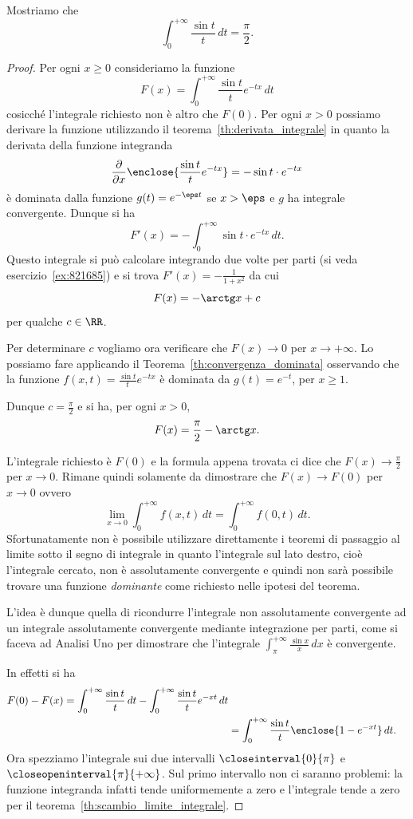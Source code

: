 \begin{exercise}
  \label{ex:integrale_sin_integrale}%
Mostriamo che 
  \[
    \int_0^{+\infty} \frac{\sin t}{t}\, dt = \frac \pi 2.
  \] 
\end{exercise}
\begin{proof}
Per ogni $x \ge 0$ consideriamo la funzione 
\[
  F(x) = \int_0^{+\infty} \frac{\sin t}{t}e^{-tx}\, dt
\]
cosicché l'integrale richiesto non è altro che $F(0)$.
Per ogni $x>0$
possiamo derivare la funzione utilizzando il teorema~\ref{th:derivata_integrale}
in quanto la derivata della funzione integranda 
\[
  \frac{\partial}{\partial x}\enclose{\frac{\sin t}{t}e^{-tx}} 
  = -\sin t \cdot e^{-tx}
\]
è dominata dalla funzione $g(t) = e^{- \eps t}$ se $x>\eps$ e 
$g$ ha integrale convergente.
Dunque si ha 
\[
  F'(x) = - \int_0^{+\infty} \sin t \cdot e^{-tx}\, dt. 
\]
Questo integrale si può calcolare integrando due volte per parti 
(si veda esercizio~\ref{ex:821685}) e si trova 
$F'(x) = -\frac{1}{1+x^2}$ da cui
\[
  F(x) = -\arctg x + c
\]
per qualche $c \in \RR$.

Per determinare $c$ 
vogliamo ora verificare che $F(x) \to 0$ per $x\to +\infty$.
Lo possiamo fare applicando il Teorema~\ref{th:convergenza_dominata} osservando che 
la funzione $f(x,t) = \frac{\sin t}{t}e^{-tx}$ è dominata da $g(t) = e^{-t}$, per $x\ge 1$.

Dunque $c=\frac{\pi} 2$ e si ha, per ogni $x>0$,
\[
  F(x) = \frac{\pi} 2 - \arctg x.
\]

L'integrale richiesto è $F(0)$ e la formula appena trovata ci 
dice che $F(x)\to \frac \pi 2$ per $x\to 0$. 
Rimane quindi solamente da dimostrare che $F(x)\to F(0)$ per 
$x\to 0$ ovvero 
\[
  \lim_{x\to 0} \int_0^{+\infty} f(x,t) \, dt
  = \int_0^{+\infty} f(0,t) \, dt.
\]
Sfortunatamente non è possibile utilizzare direttamente i teoremi 
di passaggio al limite sotto il segno di integrale in quanto 
l'integrale sul lato destro, cioè l'integrale cercato, non 
è assolutamente convergente e quindi non sarà possibile trovare 
una funzione \emph{dominante} come richiesto nelle ipotesi del teorema.

L'idea è dunque quella di ricondurre l'integrale non assolutamente convergente 
ad un integrale assolutamente convergente mediante integrazione per parti, 
come si faceva ad Analisi Uno per dimostrare che l'integrale $\int_\pi^{+\infty} \frac{\sin x}{x}\, dx$ 
è convergente.


In effetti si ha 
\begin{align*}
F(0) - F(x) 
 = \int_0^{+\infty} \frac{\sin t}{t}\, dt  - \int_0^{+\infty} \frac{\sin t}{t}e^{-xt}\, dt \\
 & = \int_0^{+\infty} \frac{\sin t}{t}\enclose{1-e^{-xt}}\, dt.
\end{align*}
Ora spezziamo l'integrale sui due intervalli $\closeinterval{0}{\pi}$ 
e $\closeopeninterval{\pi}{+\infty}$.
Sul primo intervallo non ci saranno problemi: la funzione integranda 
infatti tende uniformemente a zero e l'integrale tende a zero 
per il teorema~\ref{th:scambio_limite_integrale}.


\end{proof}
